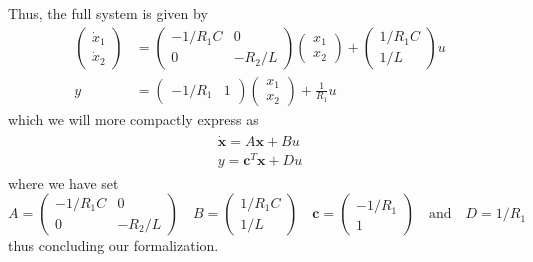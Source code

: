 \documentclass[11pt, letterpaper]{article}
\newcommand{\bs}[1]{\boldsymbol{#1}} %
\begin{document}
Thus, the full system is given by
\begin{align*}
       \begin{pmatrix}
        \dot{x}_1\\
        \dot{x}_2
    \end{pmatrix}&=\begin{pmatrix}
        -1/R_1C & 0\\
        0 & -R_2/L
    \end{pmatrix}\begin{pmatrix}
        x_1\\
        x_2
    \end{pmatrix}+\begin{pmatrix}
        1/R_1C\\
        1/L
    \end{pmatrix}u\\
    y&=\begin{pmatrix}
        -1/R_1 & 1
    \end{pmatrix}\begin{pmatrix}
        x_1\\
        x_2
    \end{pmatrix}+\frac{1}{R_1}u
\end{align*}
which we will more compactly express as
\begin{align*}
    \begin{array}{c}
        \dot{\bs{x}}=A\bs{x}+Bu\\
        y=\bs{c}^T\bs{x}+Du
    \end{array}\tag{2}
\end{align*}
where we have set
\[A=\begin{pmatrix}
    -1/R_1C & 0\\
    0 & -R_2/L
\end{pmatrix}\quad B=\begin{pmatrix}
    1/R_1C\\
    1/L
\end{pmatrix}\quad\bs{c}=\begin{pmatrix}
    -1/R_1\\
    1
\end{pmatrix}\quad\text{and}\quad D=1/R_1\]
thus concluding our formalization.
\end{document}
